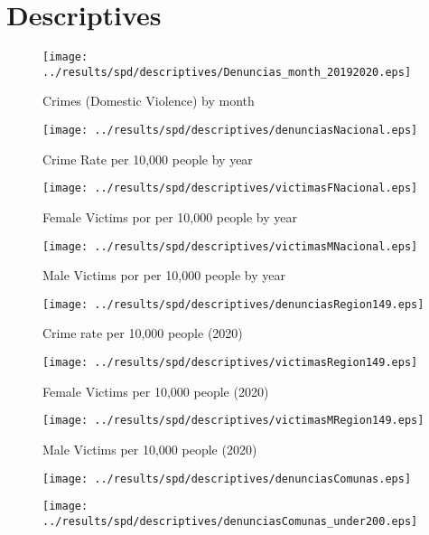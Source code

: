 \documentclass[11pt,letterpaper]{article}
\begin{document}
\section{Descriptives}
\begin{figure}[H]
\caption{Crimes (Domestic Violence) by month}
\centering
\texttt{[image: ../results/spd/descriptives/Denuncias\_month\_20192020.eps]}
\end{figure}

\begin{figure}[H]
\caption{Crime Rate per 10,000 people by year}
\centering
\texttt{[image: ../results/spd/descriptives/denunciasNacional.eps]}
\end{figure}

\begin{figure}[H]
\caption{Female Victims por per 10,000 people by year}
\centering
\texttt{[image: ../results/spd/descriptives/victimasFNacional.eps]}
\end{figure}

\begin{figure}[H]
\caption{Male Victims por per 10,000 people by year}
\centering
\texttt{[image: ../results/spd/descriptives/victimasMNacional.eps]}
\end{figure}

\begin{figure}[H]
\caption{Crime rate per 10,000 people (2020)}
\centering
\texttt{[image: ../results/spd/descriptives/denunciasRegion149.eps]}
\end{figure}

\begin{figure}[H]
\caption{Female Victims per 10,000 people (2020)}
\centering
\texttt{[image: ../results/spd/descriptives/victimasRegion149.eps]}
\end{figure}

\begin{figure}[H]
\caption{Male Victims per 10,000 people (2020)}
\centering
\texttt{[image: ../results/spd/descriptives/victimasMRegion149.eps]}
\end{figure}

\begin{figure}[H]
\caption{}
\centering
\texttt{[image: ../results/spd/descriptives/denunciasComunas.eps]}
\end{figure}

\begin{figure}[H]
\caption{}
\centering
\texttt{[image: ../results/spd/descriptives/denunciasComunas\_under200.eps]}
\end{figure}
\end{document}
